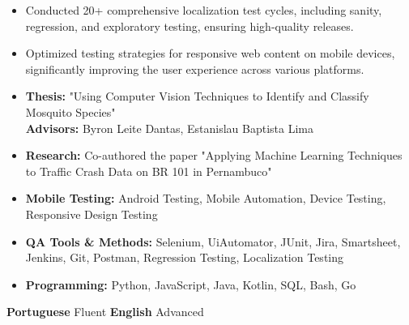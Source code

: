 \divider
\begin{itemize} 
    \item Conducted 20+ comprehensive localization test cycles, including sanity, regression, and exploratory testing, ensuring high-quality releases.
    \item Optimized testing strategies for responsive web content on mobile devices, significantly improving the user experience across various platforms.
\end{itemize}
\begin{itemize}
    \item \textbf{Thesis:} "Using Computer Vision Techniques to Identify and Classify Mosquito Species"
        \smallskip
        \\ \textbf{Advisors:} Byron Leite Dantas, Estanislau Baptista Lima
    \item \textbf{Research:} Co-authored the paper "Applying Machine Learning Techniques to Traffic Crash Data on BR 101 in Pernambuco"
\end{itemize}
% 

\begin{itemize}
    \item \textbf{Mobile Testing:} Android Testing, Mobile Automation, Device Testing, Responsive Design Testing
    \item \textbf{QA Tools \& Methods:} Selenium, UiAutomator, JUnit, Jira, Smartsheet, Jenkins, Git, Postman, Regression Testing, Localization Testing
    \item \textbf{Programming:} Python, JavaScript, Java, Kotlin, SQL, Bash, Go
\end{itemize}

\textbf{Portuguese} \hfill Fluent
\break
\textbf{English} \hfill Advanced
